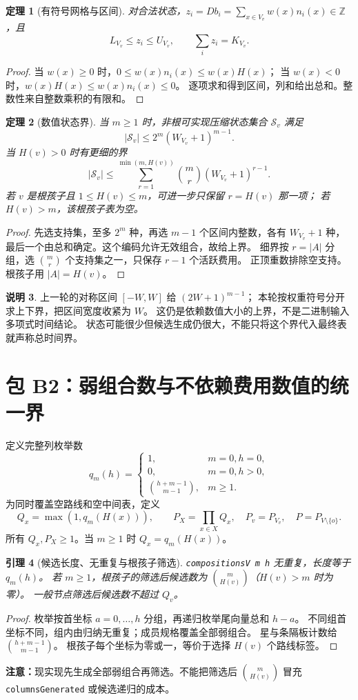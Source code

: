 \documentclass[UTF8,a4paper,11pt]{ctexart}
\newtheorem{theorem}{定理}[section]
\newtheorem{lemma}[theorem]{引理}
\theoremstyle{definition}
\newtheorem{remark}[theorem]{说明}
\newcommand{\Z}{\mathbb Z}
\begin{document}
\begin{theorem}[有符号网格与区间]
对合法状态，$z_i=Db_i=\sum_{x\in V_v}w(x)n_i(x)\in\Z$，且
\[
 L_{V_v}\le z_i\le U_{V_v},\qquad \sum_i z_i=K_{V_v}.
\]
\end{theorem}
\begin{proof}
当 $w(x)\ge0$ 时，$0\le w(x)n_i(x)\le w(x)H(x)$；
当 $w(x)<0$ 时，$w(x)H(x)\le w(x)n_i(x)\le0$。
逐项求和得到区间，列和给出总和。整数性来自整数乘积的有限和。
\end{proof}

\begin{theorem}[数值状态界]
当 $m\ge1$ 时，非根可实现压缩状态集合 $\mathcal S_v$ 满足
\[
 |\mathcal S_v|\le 2^m(W_{V_v}+1)^{m-1}.
\]
当 $H(v)>0$ 时有更细的界
\[
 |\mathcal S_v|\le
 \sum_{r=1}^{\min(m,H(v))}\binom mr(W_{V_v}+1)^{r-1}.
\]
若 $v$ 是根孩子且 $1\le H(v)\le m$，可进一步只保留 $r=H(v)$ 那一项；
若 $H(v)>m$，该根孩子表为空。
\end{theorem}
\begin{proof}
先选支持集，至多 $2^m$ 种，再选 $m-1$ 个区间内整数，各有 $W_{V_v}+1$ 种，
最后一个由总和确定。这个编码允许无效组合，故给上界。
细界按 $r=|A|$ 分组，选 $\binom mr$ 个支持集之一，只保存 $r-1$ 个活跃费用。
正顶重数排除空支持。根孩子用 $|A|=H(v)$。
\end{proof}

\begin{remark}
上一轮的对称区间 $[-W,W]$ 给 $(2W+1)^{m-1}$；
本轮按权重符号分开求上下界，把区间宽度收紧为 $W$。
这仍是依赖数值大小的上界，不是二进制输入多项式时间结论。
状态可能很少但候选生成仍很大，不能只将这个界代入最终表就声称总时间界。
\end{remark}

\section{包 B2：弱组合数与不依赖费用数值的统一界}

定义完整列枚举数
\[
 q_m(h)=\begin{cases}
 1,&m=0,h=0,\\0,&m=0,h>0,\\
 \binom{h+m-1}{m-1},&m\ge1.
 \end{cases}
\]
为同时覆盖空路线和空中间表，定义
\[
 Q_x=\max(1,q_m(H(x))),\qquad
 P_X=\prod_{x\in X}Q_x,\quad P_v=P_{V_v},\quad
 P=P_{V\setminus\{o\}}.
\]
所有 $Q_x,P_X\ge1$。当 $m\ge1$ 时 $Q_x=q_m(H(x))$。

\begin{lemma}[候选长度、无重复与根孩子筛选]
\texttt{compositionsV m h} 无重复，长度等于 $q_m(h)$。
若 $m\ge1$，根孩子的筛选后候选数为 $\binom m{H(v)}$（$H(v)>m$ 时为零）。
一般节点筛选后候选数不超过 $Q_v$。
\end{lemma}
\begin{proof}
枚举按首坐标 $a=0,\ldots,h$ 分组，再递归枚举尾向量总和 $h-a$。
不同组首坐标不同，组内由归纳无重复；成员规格覆盖全部弱组合。
星与条隔板计数给 $\binom{h+m-1}{m-1}$。
根孩子每个坐标为零或一，等价于选择 $H(v)$ 个路线标签。
\end{proof}
\textbf{注意：}现实现先生成全部弱组合再筛选。不能把筛选后 $\binom m{H(v)}$
冒充 \texttt{columnsGenerated} 或候选递归的成本。
\end{document}
